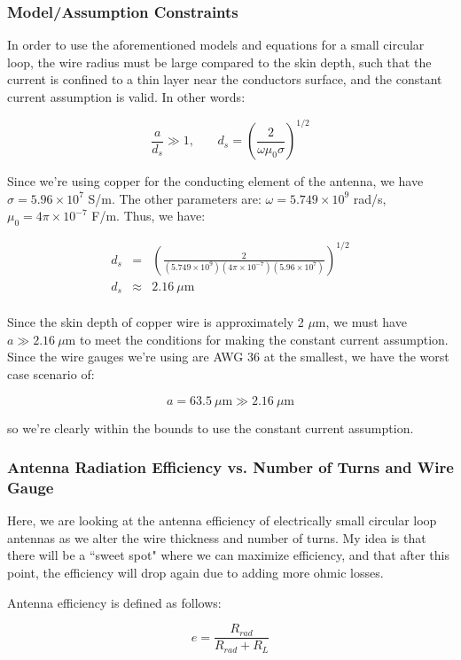 \documentclass[12pt,onecolumn,titlepage]{article}
\begin{document}
\subsubsection{Model/Assumption Constraints}
\indent \indent In order to use the aforementioned models and equations for a small circular loop, the wire radius must be large compared to the skin depth, such that the current is confined to a thin layer near the conductors surface, and the constant current assumption is valid. In other words:

\[ \frac{a}{d_s} \gg 1 \text{,} \qquad d_s = \left( \frac{2}{\omega \mu_0 \sigma} \right)^{1/2} \]

Since we're using copper for the conducting element of the antenna, we have $\sigma = 5.96 \times 10^7$ S/m. The other parameters are: $\omega = 5.749 \times 10^9$ rad/s, $\mu_0 = 4\pi \times 10^{-7}$ F/m. Thus, we have:

\begin{eqnarray}
d_s &=& \left( \frac{2}{(5.749 \times 10^9)(4\pi \times 10^{-7})(5.96 \times 10^7)} \right)^{1/2} \\
d_s &\approx& 2.16 ~ \mu \text{m} \\
\end{eqnarray}

Since the skin depth of copper wire is approximately 2 $\mu$m, we must have $a \gg 2.16 ~ \mu \text{m}$ to meet the conditions for making the constant current assumption. Since the wire gauges we're using are AWG 36 at the smallest, we have the worst case scenario of:

\[ a = 63.5 ~ \mu \text{m} \gg 2.16 ~\mu \text{m} \]

so we're clearly within the bounds to use the constant current assumption.

\subsubsection{Antenna Radiation Efficiency vs. Number of Turns and Wire Gauge}
\indent \indent Here, we are looking at the antenna efficiency of electrically small circular loop antennas as we alter the wire thickness and number of turns. My idea is that there will be a ``sweet spot" where we can maximize efficiency, and that after this point, the efficiency will drop again due to adding more ohmic losses.

Antenna efficiency is defined as follows:

\[ e = \frac{R_{rad}}{R_{rad} + R_L} \]
\end{document}
